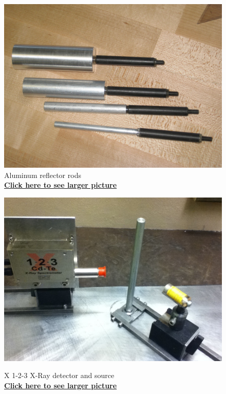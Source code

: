 \documentclass{../lab}
\begin{document}
\begin{figure}[!h]
\begin{minipage}{.49\linewidth}
    \centering
    \href{http://experimentationlab.berkeley.edu/sites/default/files/images/Rods_3450.JPG}{\includegraphics[width=\linewidth,keepaspectratio]{images/Rods_3450.JPG}} \\
    \caption{Aluminum reflector rods \\ \href{http://experimentationlab.berkeley.edu/sites/default/files/images/Rods_3450.JPG}{\textbf{Click here to see larger picture}}}
\end{minipage}\hfill
\begin{minipage}{.49\linewidth}
    \centering
    \href{http://experimentationlab.berkeley.edu/sites/default/files/images/COM_3.JPG}{\includegraphics[width=\linewidth,keepaspectratio]{images/COM_3.JPG}} \\
    \caption{X 1-2-3 X-Ray detector and source \\ \href{http://experimentationlab.berkeley.edu/sites/default/files/images/COM_3.JPG}{\textbf{Click here to see larger picture}}}
\end{minipage} 
\end{figure}
\end{document}
